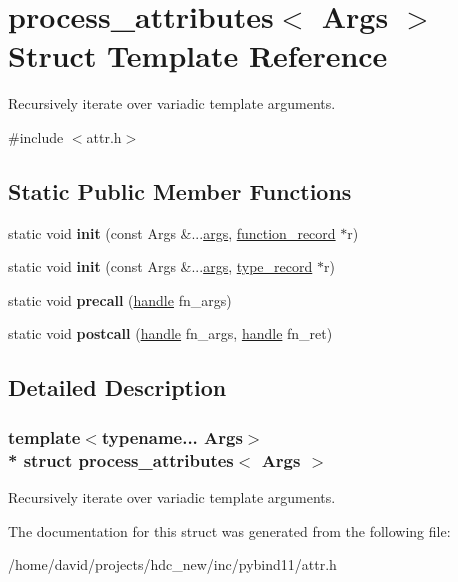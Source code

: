 \hypertarget{structprocess__attributes}{}\section{process\+\_\+attributes$<$ Args $>$ Struct Template Reference}
\label{structprocess__attributes}


Recursively iterate over variadic template arguments.  




{\ttfamily \#include $<$attr.\+h$>$}

\subsection*{Static Public Member Functions}
\begin{DoxyCompactItemize}
\item 
static void {\bfseries init} (const Args \&...\hyperlink{classargs}{args}, \hyperlink{structfunction__record}{function\+\_\+record} $\ast$r)\hypertarget{structprocess__attributes_a424f98e6700d4062c4c6bf8fb34b69a4}{}\label{structprocess__attributes_a424f98e6700d4062c4c6bf8fb34b69a4}

\item 
static void {\bfseries init} (const Args \&...\hyperlink{classargs}{args}, \hyperlink{structtype__record}{type\+\_\+record} $\ast$r)\hypertarget{structprocess__attributes_a6a2dc8a9f71bcc2f496c02924078225d}{}\label{structprocess__attributes_a6a2dc8a9f71bcc2f496c02924078225d}

\item 
static void {\bfseries precall} (\hyperlink{classhandle}{handle} fn\+\_\+args)\hypertarget{structprocess__attributes_a0694e6db40a58d6c800ec5cb1820cd12}{}\label{structprocess__attributes_a0694e6db40a58d6c800ec5cb1820cd12}

\item 
static void {\bfseries postcall} (\hyperlink{classhandle}{handle} fn\+\_\+args, \hyperlink{classhandle}{handle} fn\+\_\+ret)\hypertarget{structprocess__attributes_ad3a6b86e4d99a9f7cdc4492412d70c6a}{}\label{structprocess__attributes_ad3a6b86e4d99a9f7cdc4492412d70c6a}

\end{DoxyCompactItemize}


\subsection{Detailed Description}
\subsubsection*{template$<$typename... Args$>$\\*
struct process\+\_\+attributes$<$ Args $>$}

Recursively iterate over variadic template arguments. 

The documentation for this struct was generated from the following file\+:\begin{DoxyCompactItemize}
\item 
/home/david/projects/hdc\+\_\+new/inc/pybind11/attr.\+h\end{DoxyCompactItemize}
